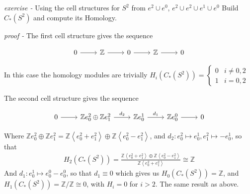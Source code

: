 \documentclass[11pt]{article}
\theoremstyle{definition}
\newcommand{\gen}[1]{\left\langle #1 \right\rangle}
\begin{document}


    \emph{exercise - }\label{HEx5} Using the cell structures for \(S^2\) from \(e^2 \cup e^0\), \(e^2 \cup e^2 \cup e^1 \cup e^0\) Build \(C_*(S^2)\) and compute its Homology.

    \emph{proof - } The first cell structure gives the sequence

    \begin{equation*}
        \begin{tikzcd}
            0 \arrow[r] & \mathbb{Z} \arrow[r] & 0 \arrow[r] & \mathbb{Z} \arrow[r] & 0
        \end{tikzcd}
    \end{equation*}

    In this case the homology modules are trivially \(H_i(C_*(S^2)) = \begin{cases}
        0 & i \neq 0,2 \\
        1 & i = 0,2
    \end{cases}\)

    The second cell structure gives the sequence

    \begin{equation*}
        \begin{tikzcd}
            0 \arrow[r] & \mathbb{Z}e_0^2 \oplus \mathbb{Z}e_1^2 \arrow[r,"{d_2}"] & \mathbb{Z}e_0^1 \arrow[r,"{d_1}"] & \mathbb{Z}e_0^0 \arrow[r] & 0
        \end{tikzcd}
    \end{equation*}

    Where \(\mathbb{Z}e_0^2 \oplus \mathbb{Z}e_1^2 = \mathbb{Z}\gen{e_0^2 + e_1^2} \oplus \mathbb{Z}\gen{e_0^2 - e_1^2}\), and \(d_2: e_0^2 \mapsto e_0^1, e_1^2 \mapsto -e_0^1\), so that
    \begin{align*}
        H_2(C_*(S^2)) = \frac{\mathbb{Z}\gen{e_0^2 + e_1^2} \oplus \mathbb{Z}\gen{e_0^2 - e_1^2}}{\mathbb{Z}\gen{e_0^2 + e_1^2}} \cong \mathbb{Z}
    \end{align*}
    And \(d_1: e_0^1 \mapsto e_0^0 - e_0^0\), so that \(d_1 \equiv 0\) which gives us \(H_0(C_*(S^2)) = \mathbb{Z}\), and \(H_1(C_*(S^2)) = \mathbb{Z}/\mathbb{Z} \cong 0\), with \(H_i = 0\) for \(i > 2\). The same result as above.
    



\end{document}
